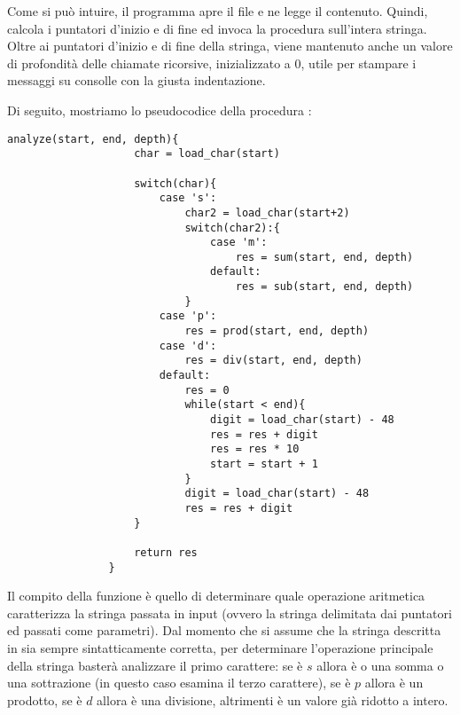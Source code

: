        Come si può intuire, il programma apre il file  e ne legge il contenuto. Quindi, calcola i puntatori d'inizio e di fine ed invoca la procedura  sull'intera stringa. Oltre ai puntatori d'inizio e di fine della stringa, viene mantenuto anche un valore di profondità delle chiamate ricorsive, inizializzato a $0$, utile per stampare i messaggi su consolle con la giusta indentazione.
        
        Di seguito, mostriamo lo pseudocodice della procedura :
		
        \begin{center}
           	\begin{lstlisting}[language=pseudo, gobble=14]
                analyze(start, end, depth){
                    char = load_char(start)
    	           	
                    switch(char){
                        case 's':
                            char2 = load_char(start+2)
                            switch(char2):{
                                case 'm':
                                    res = sum(start, end, depth)
                                default:
                                    res = sub(start, end, depth)
                            }
                        case 'p':
                            res = prod(start, end, depth)
                        case 'd':
                            res = div(start, end, depth)
                        default:
                            res = 0
                            while(start < end){
                                digit = load_char(start) - 48
                                res = res + digit
                                res = res * 10
                                start = start + 1
                            }
                            digit = load_char(start) - 48
                            res = res + digit
                    }
                    
                    return res
                }
           	\end{lstlisting}
        \end{center}
        
        Il compito della funzione  è quello di determinare quale operazione aritmetica caratterizza la stringa passata in input (ovvero la stringa delimitata dai puntatori  ed  passati come parametri). Dal momento che si assume che la stringa descritta in  sia sempre sintatticamente corretta, per determinare l'operazione principale della stringa basterà analizzare il primo carattere: se è $s$ allora è o una somma o una sottrazione (in questo caso esamina il terzo carattere), se è $p$ allora è un prodotto, se è $d$ allora è una divisione, altrimenti è un valore già ridotto a intero.
        
